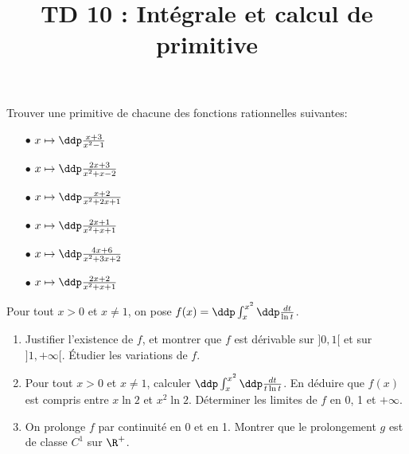 \documentclass[a4paper, 11pt,reqno]{article}
\begin{document}
\title{TD 10 :  Intégrale et calcul de primitive}


\begin{exercice}
	Trouver une primitive de chacune des fonctions rationnelles suivantes:\\
	\begin{minipage}[t]{0.3\textwidth}
		\begin{itemize}
			\item[$\bullet$] $x\mapsto \ddp\frac{x+3}{x^2-1}$
			\item[$\bullet$] $x\mapsto \ddp\frac{2x+3}{x^2+x-2}$
		\end{itemize}
	\end{minipage}
	\begin{minipage}[t]{0.3\textwidth}
		\begin{itemize}
			\item[$\bullet$] $x\mapsto \ddp\frac{x+2}{x^2+2x+1}$
			\item[$\bullet$] $x\mapsto \ddp\frac{2x+1}{x^2+x+1}$
		\end{itemize}
	\end{minipage}
	\begin{minipage}[t]{0.3\textwidth}
		\begin{itemize}
			\item[$\bullet$] $x\mapsto \ddp\frac{4x+6}{x^2+3x+2}$
			\item[$\bullet$] $x\mapsto \ddp\frac{2x+2}{x^2+x+1}$
		\end{itemize}
	\end{minipage}
\end{exercice}


\begin{exercice}  \;
	Pour tout $x>0$ et $x\not= 1$, on pose $f(x)=\ddp \int_x^{x^2} \ddp\frac{dt}{\ln{t}}$.
	\begin{enumerate}
		\item Justifier l'existence de $f$, et montrer que $f$ est d\'erivable sur $\rbrack 0,1\lbrack$ et sur
		      $\rbrack 1,+\infty\lbrack$. \'Etudier les variations de $f$.
		\item Pour tout $x>0$ et $x\not= 1$, calculer $\ddp \int_x^{x^2} \ddp\frac{dt}{t\ln{t}}$. En d\'eduire que $f(x)$ est compris entre $x\ln{2}$ et $x^2\ln{2}$. D\'eterminer les limites de $f$ en 0, 1 et $+\infty$.
		\item On prolonge $f$ par continuit\'e en 0 et en 1. Montrer que le prolongement $g$ est de classe $C^1$ sur $\R^+$.
	\end{enumerate}
\end{exercice}
\end{document}
